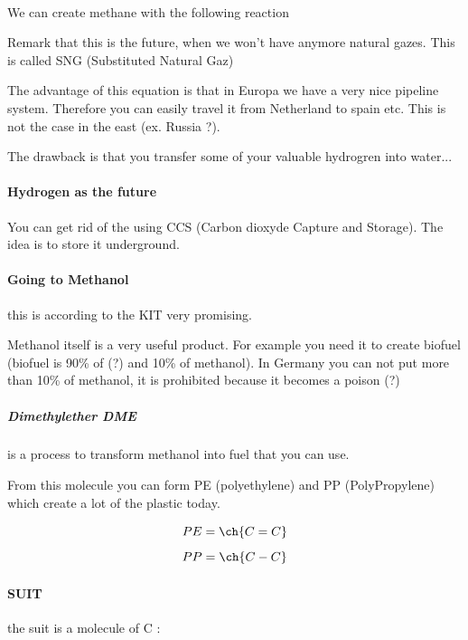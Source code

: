 \documentclass[10pt,a4paper]{article}
\begin{document}
\paragraph{} We can create methane with the following reaction


Remark that this is the future, when we won't have anymore natural gazes. This is called SNG (Substituted Natural Gaz)


The advantage of this equation is that in Europa we have a very nice pipeline system. Therefore you can easily travel it from Netherland to spain etc. This is not the case in the east (ex. Russia ?).

The drawback is that you transfer some of your valuable hydrogren into water...

\paragraph{Hydrogen as the future} 

You can get rid of the  using CCS (Carbon dioxyde Capture and Storage). The idea is to store it underground.

\paragraph{Going to Methanol} this is according to the KIT very promising.

Methanol itself is a very useful product. For example you need it to create biofuel (biofuel is 90\% of (?) and 10\% of methanol). In Germany you can not put more than 10\% of methanol, it is prohibited because it becomes a poison (?)

\subparagraph{Dimethylether DME} is a process to transform methanol into fuel that you can use.


From this molecule you can form PE (polyethylene) and PP (PolyPropylene) which create a lot of the plastic today.

$$ PE = \ch{C = C} $$
$$ PP = \ch{C-C} $$

\paragraph{SUIT} the suit is a molecule of C :

\end{document}

